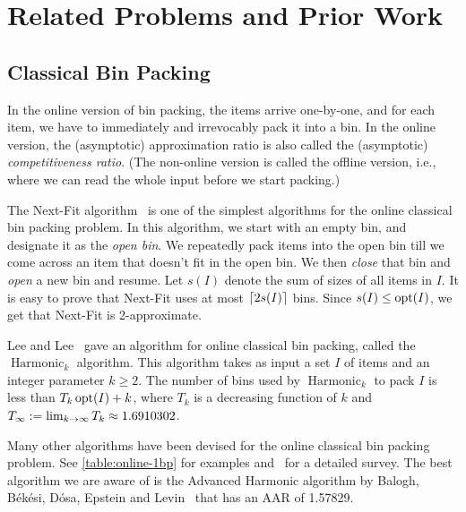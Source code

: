 \chapter{Related Problems and Prior Work}
\label{chap:prior-work}

\section{Classical Bin Packing}

In the online version of bin packing, the items arrive one-by-one,
and for each item, we have to immediately and irrevocably pack it into a bin.
In the online version, the (asymptotic) approximation ratio is also called the
(asymptotic) \emph{competitiveness ratio}.
(The non-online version is called the offline version, i.e., where we can read the
whole input before we start packing.)

The Next-Fit algorithm~\cite{johnson-thesis} is one of the simplest algorithms
for the online classical bin packing problem.
In this algorithm, we start with an empty bin, and designate it as the \emph{open bin}.
We repeatedly pack items into the open bin till we
come across an item that doesn't fit in the open bin.
We then \emph{close} that bin and \emph{open} a new bin and resume.
Let $s(I)$ denote the sum of sizes of all items in $I$.
It is easy to prove that Next-Fit uses at most $\left\lceil 2s(I) \right\rceil$ bins.
Since $s(I) \le \operatorname{opt}(I)$, we get that Next-Fit is 2-approximate.

Lee and Lee~\cite{leelee} gave an algorithm for online classical bin packing,
called the $\operatorname{Harmonic}_k$ algorithm.
This algorithm takes as input a set $I$ of items and an integer parameter $k \ge 2$.
The number of bins used by $\operatorname{Harmonic}_k$ to pack $I$ is less than
$T_k\operatorname{opt}(I) + k$, where $T_k$ is a decreasing function of $k$
and $T_{\infty} := \lim_{k \to \infty} T_k \approx 1.6910302$.

Many other algorithms have been devised for the online classical bin packing problem.
See \cref{table:online-1bp} for examples and~\cite{handbook-of-combinopt-bp} for a detailed survey.
The best algorithm we are aware of is the Advanced Harmonic algorithm by
Balogh, B\'ek\'esi, D\'osa, Epstein and Levin~\cite{balogh2018}
that has an AAR of 1.57829.

